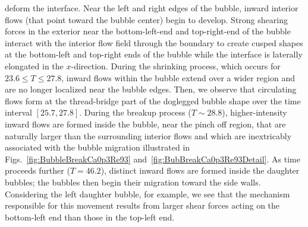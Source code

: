 \documentclass[%
 reprint,
 showkeys,
 amsmath,amssymb,
 aps,
 prfluids,
 onecolumn
]{revtex4-2}
\begin{document}
deform the interface.  Near the left and right edges of the bubble, inward
interior flows (that point toward the bubble center) begin to develop.  Strong
shearing forces in the exterior near the bottom-left-end and top-right-end of
the bubble interact with the interior flow field through the boundary to create
cusped shapes at the bottom-left and top-right ends of the bubble while the
interface is laterally elongated in the $x$-direction.  During the shrinking
process, which occurs for $23.6 \leq T \leq 27.8$, inward flows within the
bubble extend over a wider region and are no longer localized near the bubble
edges.  Then, we observe that circulating flows form at the thread-bridge part
of the doglegged bubble shape over the time interval $[25.7, 27.8]$.  During
the breakup process ($T \sim 28.8$), higher-intensity inward flows are formed
inside the bubble, near the pinch off region, that are naturally larger than
the surrounding interior flows and which are inextricably associated with the
bubble migration illustrated in Figs.~\ref{fig:BubbleBreakCa0p3Re93}
and~\ref{fig:BubBreakCa0p3Re93Detail}.  As time proceeds further ($T =  46.2$),
distinct inward flows are formed inside the daughter bubbles; the bubbles then
begin their migration toward the side walls.  Considering the left daughter
bubble, for example, we see that the mechanism responsible for this movement
results from larger shear forces acting on the bottom-left end than those in
the top-left end.
\end{document}
